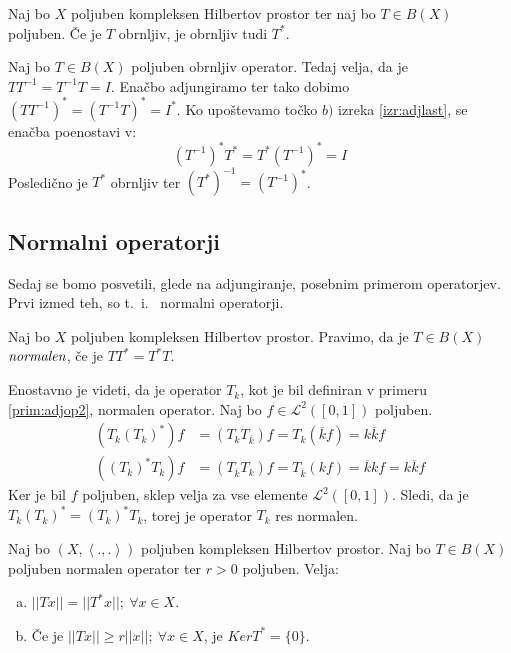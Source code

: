 \documentclass[mat2]{matdelo}
\newcommand{\abs}[1]{\ensuremath{\lvert #1 \rvert}}
\newcommand{\norm}[1]{\abs{\abs{#1}}}
\newcommand{\pojem}[1]{\ensuremath{\emph{#1}}}
\newcommand{\Sp}[2]{\ensuremath{\left<#1, #2\right>}}
\begin{document}
			\begin{lema}
				\label{lem:adjinv}
				Naj bo $X$ poljuben kompleksen Hilbertov prostor ter naj bo $T\in B(X)$ poljuben. Če je $T$ obrnljiv, je obrnljiv tudi $T^*$.
			\end{lema}
		
			\begin{dokaz}
				Naj bo $T\in B(X)$ poljuben obrnljiv operator. Tedaj velja, da je $TT^{-1} = T^{-1}T = I$. Enačbo adjungiramo ter tako dobimo $(TT^{-1})^* = (T^{-1}T)^* = I^*$. Ko upoštevamo točko $b)$ izreka \ref{izr:adjlast}, se enačba poenostavi v: $$(T^{-1})^*T^* = T^*(T^{-1})^* = I$$
				Posledično je $T^*$ obrnljiv ter $(T^*)^{-1} = (T^{-1})^*$.
			\end{dokaz}
			
		\subsection{Normalni operatorji}
		
			Sedaj se bomo posvetili, glede na adjungiranje, posebnim primerom operatorjev. Prvi izmed teh, so t.~i.~ normalni operatorji.
			
			\begin{definicija}
				\label{def:normalop}
				Naj bo $X$ poljuben kompleksen Hilbertov prostor. Pravimo, da je $T \in B(X)$ \pojem{normalen}, če je $TT^* = T^*T$.
			\end{definicija}
			
			\begin{primer}
				\label{prim:normalop}
				Enostavno je videti, da je operator $T_k$, kot je bil definiran v primeru \ref{prim:adjop2}, normalen operator. Naj bo $f\in \mathcal{L}^2([0, 1])$ poljuben.
				\begin{align*}
					(T_k(T_k)^*)f &= (T_kT_{\overline{k}})f =T_k(\overline{k}f) = k\overline{k}f \\
					((T_k)^*T_k)f &= (T_{\overline{k}}T_k)f = T_{\overline{k}}(kf)=\overline{k}kf = k\overline{k}f
				\end{align*}
				Ker je bil $f$ poljuben, sklep velja za vse elemente $\mathcal{L}^2([0, 1])$. Sledi, da je $T_k(T_k)^* = (T_k)^*T_k$, torej je operator $T_k$ res normalen.
			\end{primer}
			
			\begin{lema}
				\label{lem:normalnorm}
				Naj bo $(X, \Sp{.}{.})$ poljuben kompleksen Hilbertov prostor. Naj bo $T\in B(X)$ poljuben normalen operator ter $r > 0$ poljuben. Velja: \begin{enumerate}[a)]
					\item $\norm{Tx} = \norm{T^*x};~\forall x\in X$.
					\item Če je $\norm{Tx} \geq r\norm{x};~\forall x\in X$, je $KerT^* = \{0\}$.
				\end{enumerate}
			\end{lema}
			
\end{document}

